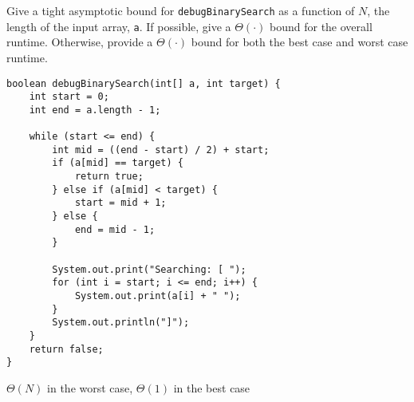 \begin{blocksection}
\question Give a tight asymptotic bound for \lstinline$debugBinarySearch$ as a
function of $N$, the length of the input array, \lstinline$a$. If possible,
give a $\Theta(\cdot)$ bound for the overall runtime. Otherwise, provide a
$\Theta(\cdot)$ bound for both the best case and worst case runtime.

\begin{lstlisting}
boolean debugBinarySearch(int[] a, int target) {
    int start = 0;
    int end = a.length - 1;

    while (start <= end) {
        int mid = ((end - start) / 2) + start;
        if (a[mid] == target) {
            return true;
        } else if (a[mid] < target) {
            start = mid + 1;
        } else {
            end = mid - 1;
        }

        System.out.print("Searching: [ ");
        for (int i = start; i <= end; i++) {
            System.out.print(a[i] + " ");
        }
        System.out.println("]");
    }
    return false;
}
\end{lstlisting}

\begin{solution}[0.5in]
$\Theta(N)$ in the worst case, $\Theta(1)$ in the best case
\end{solution}
\end{blocksection}
